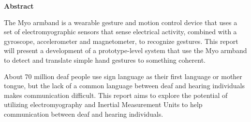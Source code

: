 \vspace*{\fill}
{\centering\huge\bfseries Abstract \par}
The Myo armband is a wearable gesture and motion control device that uses a set of electromyographic sensors that sense electrical activity, combined with a gyroscope, accelerometer and magnetometer, to recognize gestures. This report will present a development of a prototype-level system that use the Myo armband to detect and translate simple hand gestures to something coherent.

About 70 million deaf people use sign language as their first language or mother tongue, but the lack of a common language between deaf and hearing individuals makes communication difficult. This report aims to explore the potential of utilizing electromyography and Inertial Measurement Units to help communication between deaf and hearing individuals.
\vspace*{\fill}